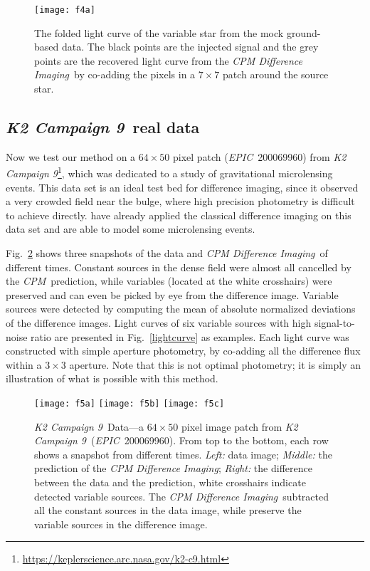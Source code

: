 \documentclass[12pt, preprint]{aastex}
\newcommand{\project}[1]{\textsl{#1}}
\newcommand{\cpm}{\project{CPM}}
\newcommand{\cpmdiff}{\project{CPM Difference Imaging}}
\newcommand{\KTCN}{\project{K2 Campaign 9}}
\newcommand{\epic}{\project{EPIC}}
\begin{document}
\begin{figure}[p]
\begin{center}
\texttt{[image: f4a]}
\end{center}
\caption{
\label{ground_lc}
 The folded light curve of the variable star from the mock ground-based data.
 The black points are the injected signal and the grey points are the recovered light curve from the \cpmdiff\ by co-adding the pixels in a $7\times 7$ patch around the source star.
}
\end{figure}

\subsection{\KTCN\ real data}
Now we test our method on a $64\times50$ pixel patch (\epic\ 200069960) from \KTCN\footnote{\url{https://keplerscience.arc.nasa.gov/k2-c9.html}}\citep{k2c9}, which was dedicated to a study of gravitational microlensing events.
This data set is an ideal test bed for difference imaging, since it observed a very crowded field near the bulge, where high precision photometry is difficult to achieve directly.
\cite{wei} have already applied the classical difference imaging on this data set and are able to model some microlensing events.

Fig.~\ref{k2c9} shows three snapshots of the data and \cpmdiff\ of different times.
Constant sources in the dense field were almost all cancelled by the \cpm\ prediction, while variables (located at the white crosshairs) were preserved and can even be picked by eye from the difference image.
Variable sources were detected by computing the mean of absolute normalized deviations of the difference images. 
Light curves of six variable sources with high signal-to-noise ratio are presented in Fig.~\ref{lightcurve} as examples. 
Each light curve was constructed with simple aperture photometry, by co-adding all the difference flux within a $3 \times 3$ aperture. 
Note that this is not optimal photometry; it is simply an illustration of what is possible with this method.

\begin{figure}[p]
\begin{center}
\texttt{[image: f5a]}
\texttt{[image: f5b]}
\texttt{[image: f5c]}
\end{center}
\caption{
  \label{k2c9}
  \KTCN\ Data---a $64\times 50$ pixel image patch from \KTCN\ (\epic\ 200069960). 
  From top to the bottom,  each row shows a snapshot from different times.
  \emph{Left:} data image;
  \emph{Middle:} the prediction of the \cpmdiff;
  \emph{Right:} the difference between the data and the prediction, white crosshairs indicate detected variable sources.
  The \cpmdiff\ subtracted all the constant sources in the data image, while preserve the variable sources in the difference image.
}
\end{figure}
\end{document}
